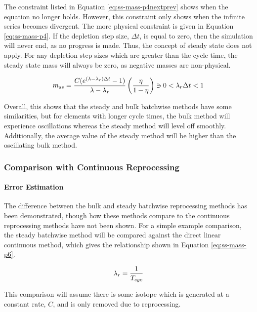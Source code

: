 The constraint listed in Equation \eqref{eq:ss-mass-p4nextprev} shows when the equation no longer holds. However, this constraint only shows when the infinite series becomes divergent. The more physical constraint is given in Equation \eqref{eq:ss-mass-p4}. If the depletion step size, $\Delta t$, is equal to zero, then the simulation will never end, as no progress is made. Thus, the concept of steady state does not apply. For any depletion step sizes which are greater than the cycle time, the steady state mass will always be zero, as negative masses are non-physical.

\begin{equation} \hfill 
m_{ss} = \frac{C (e^{(\lambda - \lambda_r) \Delta t} - 1)}{\lambda - \lambda_r}  \left( \frac{\eta}{1 - \eta} \right) \ni 0 < \lambda_r \Delta t < 1
\hfill\label{eq:ss-mass-p4} \end{equation}

Overall, this shows that the steady and bulk batchwise methods have some similarities, but for elements with longer cycle times, the bulk method will experience oscillations whereas the steady method will level off smoothly. Additionally, the average value of the steady method will be higher than the oscillating bulk method.

\subsubsection{Comparison with Continuous Reprocessing}

\paragraph{Error Estimation}

The difference between the bulk and steady batchwise reprocessing methods has been demonstrated, though how these methods compare to the continuous reprocessing methods have not been shown. For a simple example comparison, the steady batchwise method will be compared against the direct linear continuous method, which gives the relationship shown in Equation \eqref{eq:ss-mass-p6}.

\begin{equation} \hfill 
\lambda_r = \frac{1}{T_{cyc}}
\hfill\label{eq:ss-mass-p6} \end{equation}

This comparison will assume there is some isotope which is generated at a constant rate, $C$, and is only removed due to reprocessing.


